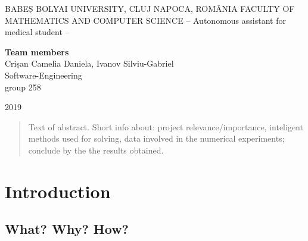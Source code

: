 \documentclass[runningheads,a4paper,11pt]{report}
\begin{document}
\begin{titlepage}
\sloppy

\begin{center}
BABEȘ BOLYAI UNIVERSITY, CLUJ NAPOCA, ROMÂNIA
FACULTY OF MATHEMATICS AND COMPUTER SCIENCE
\vspace{6cm}
\Huge \textbf{}
\vspace{1cm}
\normalsize -- Autonomous assistant for medical student --
\end{center}


\vspace{5cm}

\begin{flushright}
\Large{\textbf{Team members}}\\
Crișan Camelia Daniela, Ivanov Silviu-Gabriel
\\Software-Engineering
\\group 258
\end{flushright}

\vspace{4cm}

\begin{center}
2019
\end{center}

\end{titlepage}


\begin{abstract}
	Text of abstract. Short info about: project relevance/importance, inteligent methods used for solving, data involved in the numerical experiments; conclude by the the results obtained.
\end{abstract}


\tableofcontents

\newpage

\listoftables
\listoffigures
\listofalgorithms

\newpage




\newpage



 


\chapter{Introduction}
\label{chapter:introduction}

\section{What? Why? How?}
\label{section:what}
\end{document}
